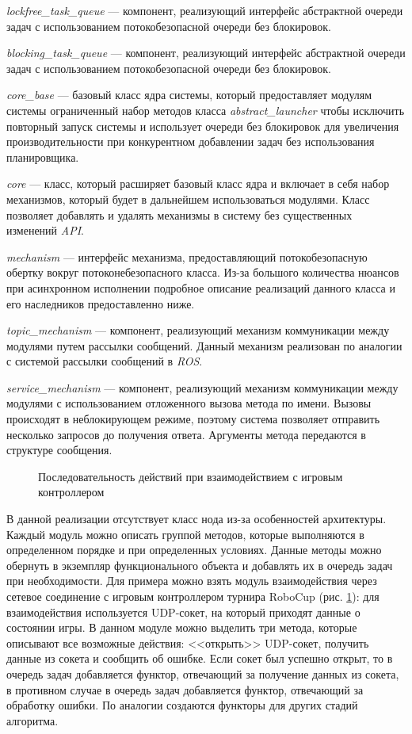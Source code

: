 \textit{lockfree\_task\_queue} --- компонент, реализующий 
интерфейс абстрактной очереди задач с использованием 
потокобезопасной очереди без блокировок.

\textit{blocking\_task\_queue} --- компонент, реализующий 
интерфейс абстрактной очереди задач с использованием 
потокобезопасной очереди без блокировок.

\textit{core\_base} --- базовый класс ядра системы, который предоставляет модулям системы ограниченный набор методов класса \textit{abstract\_launcher} чтобы исключить повторный запуск системы и использует очереди без блокировок для увеличения производительности при конкурентном добавлении задач без использования планировщика.

\textit{core} --- класс, который расширяет базовый класс ядра и 
включает в себя набор механизмов, который будет в дальнейшем 
использоваться модулями. Класс позволяет добавлять и удалять 
механизмы в систему без существенных изменений \textit{API}.

\textit{mechanism} --- интерфейс механизма, предоставляющий потокобезопасную обертку вокруг потоконебезопасного класса. Из-за большого количества нюансов при асинхронном исполнении подробное описание реализаций данного класса и его наследников предоставленно ниже.

\textit{topic\_mechanism} --- компонент, реализующий механизм 
коммуникации между модулями путем рассылки сообщений. Данный 
механизм реализован по аналогии с системой рассылки сообщений в 
\textit{ROS}.

\textit{service\_mechanism} --- компонент, реализующий механизм коммуникации между модулями с использованием отложенного вызова метода по имени. Вызовы происходят в неблокирующем режиме, поэтому система позволяет отправить несколько запросов до получения ответа. Аргументы метода передаются в структуре сообщения.

\begin{figure}[h]
    \centering{\texttt{[image: 2\_3\_2\_gc]}}
    \caption{Последовательность действий при взаимодействием с игровым контроллером}
    \label{im:2_3_2_gc}
\end{figure}

В данной реализации отсутствует класс нода из-за особенностей 
архитектуры. Каждый модуль можно описать группой методов, 
которые выполняются в определенном порядке и при определенных 
условиях. Данные методы можно обернуть в экземпляр 
функционального объекта и добавлять их в очередь задач при 
необходимости. Для примера можно взять модуль взаимодействия 
через сетевое соединение с игровым контроллером турнира RoboCup 
(рис. \ref{im:2_3_2_gc}): для взаимодействия используется 
UDP-сокет, на который приходят данные о состоянии игры. В данном 
модуле можно выделить три метода, которые описывают все 
возможные действия: <<открыть>> UDP-сокет, получить данные из 
сокета и сообщить об ошибке. Если сокет был успешно открыт, то в 
очередь задач добавляется функтор, отвечающий за получение 
данных из сокета, в противном случае в очередь задач добавляется 
функтор, отвечающий за обработку ошибки. По аналогии создаются 
функторы для других стадий алгоритма.

